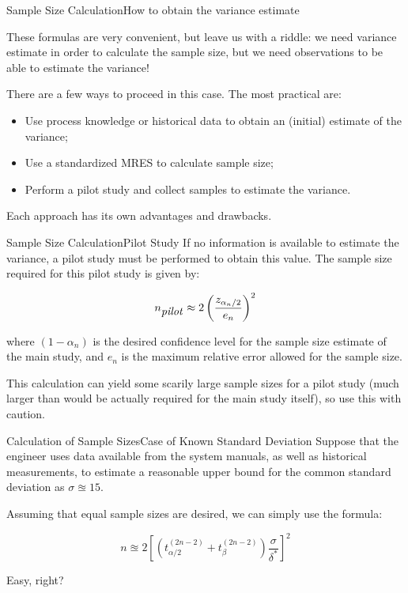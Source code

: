 \begin{frame}{Sample Size Calculation}{How to obtain the variance estimate}

These formulas are very convenient, but leave us with a riddle: we need variance estimate in order to calculate the sample size, but we need observations to be able to estimate the variance!\bigskip

There are a few ways to proceed in this case. The most practical are:

\begin{itemize}
  \item Use process knowledge or historical data to obtain an (initial) estimate of the variance;
  \item Use a standardized MRES to calculate sample size;
  \item Perform a pilot study and collect samples to estimate the variance.
\end{itemize}\bigskip

Each approach has its own advantages and drawbacks.
\end{frame}

\begin{frame}{Sample Size Calculation}{Pilot Study}
If no information is available to estimate the variance, a pilot study must be performed to obtain this value. The sample size required for this pilot study is given by:

\begin{equation*}
n_{\mbox{\textit{pilot}}}\approx 2\left(\frac{z_{\alpha_n/2}}{e_{n}}\right)^2
\end{equation*}

\noindent where $(1-\alpha_{n})$ is the desired confidence level for the sample size estimate of the main study, and $e_n$ is the maximum relative error allowed for the sample size.\bigskip

This calculation can yield some scarily large sample sizes for a pilot study (much larger than would be actually required for the main study itself), so use this with caution.
\end{frame}


\begin{frame}{Calculation of Sample Sizes}{Case of Known Standard Deviation}
Suppose that the engineer uses data available from the system manuals, as well as historical measurements, to estimate a reasonable upper bound for the common standard deviation as $\sigma \approxeq 15$.\bigskip

Assuming that equal sample sizes are desired, we can simply use the formula:

\begin{equation*}
n \approxeq 2\left[\left(t^{(2n-2)}_{\alpha/2}+t^{(2n-2)}_{\beta}\right)\frac{\sigma}{\delta^*}\right]^2
\end{equation*}
\vfill

\hfill Easy, right?
\end{frame}

